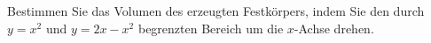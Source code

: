 \question[10] Bestimmen Sie das Volumen des erzeugten Festkörpers, indem Sie den durch $y = x^2$ und $y = 2x - x^2$ begrenzten Bereich um die $x$-Achse drehen.
